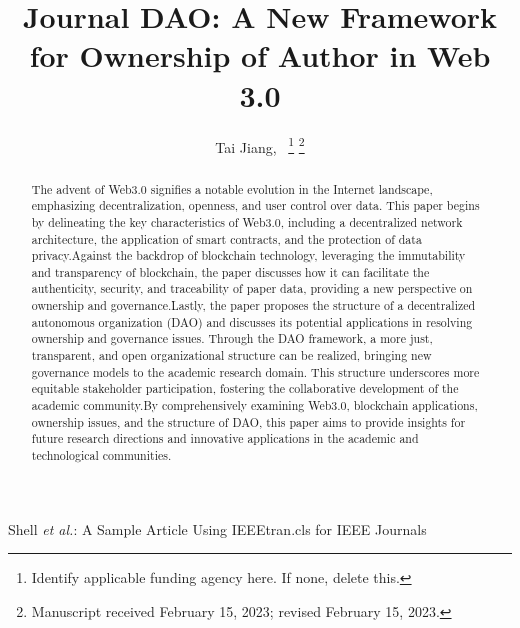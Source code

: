 \documentclass[lettersize,journal]{IEEEtran}
\begin{document}
\title{Journal DAO: A New Framework for Ownership of Author in Web 3.0}

\author{Tai Jiang,~
\thanks{Identify applicable funding agency here. If none, delete this.}%
\thanks{Manuscript received February 15, 2023; revised February 15, 2023.}}

%
{Shell \MakeLowercase{\textit{et al.}}: A Sample Article Using IEEEtran.cls for IEEE Journals}


\maketitle

\begin{abstract}
The advent of Web3.0 signifies a notable evolution in the Internet landscape, emphasizing decentralization, openness, and user control over data. This paper begins by delineating the key characteristics of Web3.0, including a decentralized network architecture, the application of smart contracts, and the protection of data privacy.Against the backdrop of blockchain technology, leveraging the immutability and transparency of blockchain, the paper discusses how it can facilitate the authenticity, security, and traceability of paper data, providing a new perspective on ownership and governance.Lastly, the paper proposes the structure of a decentralized autonomous organization (DAO) and discusses its potential applications in resolving ownership and governance issues. Through the DAO framework, a more just, transparent, and open organizational structure can be realized, bringing new governance models to the academic research domain. This structure underscores more equitable stakeholder participation, fostering the collaborative development of the academic community.By comprehensively examining Web3.0, blockchain applications, ownership issues, and the structure of DAO, this paper aims to provide insights for future research directions and innovative applications in the academic and technological communities.


\end{abstract}
\end{document}
